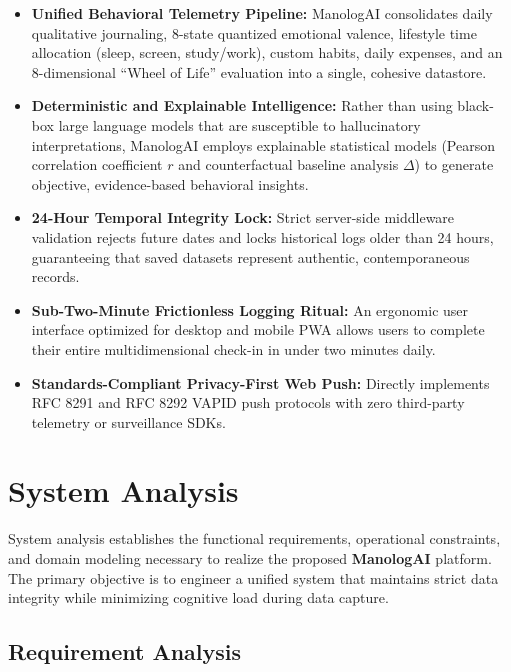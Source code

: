 \begin{itemize}
  \item \textbf{Unified Behavioral Telemetry Pipeline:} ManologAI consolidates daily qualitative journaling, 8-state quantized emotional valence, lifestyle time allocation (sleep, screen, study/work), custom habits, daily expenses, and an 8-dimensional ``Wheel of Life'' evaluation into a single, cohesive datastore.
  \item \textbf{Deterministic and Explainable Intelligence:} Rather than using black-box large language models that are susceptible to hallucinatory interpretations, ManologAI employs explainable statistical models (Pearson correlation coefficient $r$ and counterfactual baseline analysis $\Delta$) to generate objective, evidence-based behavioral insights.
  \item \textbf{24-Hour Temporal Integrity Lock:} Strict server-side middleware validation rejects future dates and locks historical logs older than 24 hours, guaranteeing that saved datasets represent authentic, contemporaneous records.
  \item \textbf{Sub-Two-Minute Frictionless Logging Ritual:} An ergonomic user interface optimized for desktop and mobile PWA allows users to complete their entire multidimensional check-in in under two minutes daily.
  \item \textbf{Standards-Compliant Privacy-First Web Push:} Directly implements RFC 8291 and RFC 8292 VAPID push protocols with zero third-party telemetry or surveillance SDKs.
\end{itemize}


\chapter{System Analysis}
\label{Chapter3}

System analysis establishes the functional requirements, operational constraints, and domain modeling necessary to realize the proposed \textbf{ManologAI} platform. The primary objective is to engineer a unified system that maintains strict data integrity while minimizing cognitive load during data capture.

\section{Requirement Analysis}

